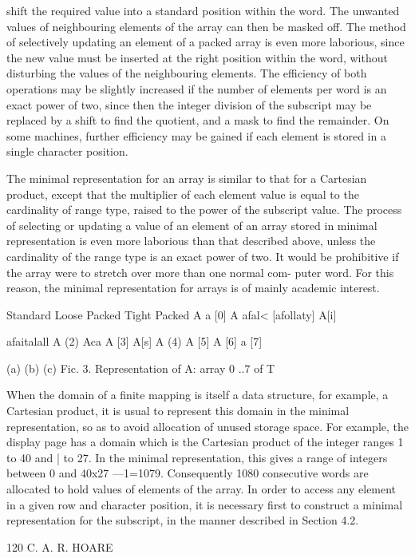 {{{			shift the required value into a standard position within the word. The unwanted values of neighbouring elements of the array can then be masked off. The method of selectively updating an element of a packed array is even more laborious, since the new value must be inserted at the right position within the word, without disturbing the values of the neighbouring elements. The efficiency of both operations may be slightly increased if the number of elements per word is an exact power of two, since then the integer division of the subscript may be replaced by a shift to find the quotient, and a mask to find the remainder. On some machines, further efficiency may be gained if each element is stored in a single character position.
			
			The minimal representation for an array is similar to that for a Cartesian product, except that the multiplier of each element value is equal to the cardinality of range type, raised to the power of the subscript value. The process of selecting or updating a value of an element of an array stored in minimal representation is even more laborious than that described above, unless the cardinality of the range type is an exact power of two. It would be prohibitive if the array were to stretch over more than one normal com- puter word. For this reason, the minimal representation for arrays is of mainly academic interest.
			
			
			Standard Loose Packed Tight Packed A a [0] A afal< [afollaty] A[i] {afaitalall A (2) Aca A [3] A[s] A (4) A [5] A [6] a [7]
				
				(a) (b) (c) Fic. 3. Representation of A: array 0 ..7 of T
				
				When the domain of a finite mapping is itself a data structure, for example, a Cartesian product, it is usual to represent this domain in the minimal representation, so as to avoid allocation of unused storage space. For example, the display page has a domain which is the Cartesian product of the integer ranges 1 to 40 and | to 27. In the minimal representation, this gives a range of integers between 0 and 40x27 —1=1079. Consequently 1080 consecutive words are allocated to hold values of elements of the array. In order to access any element in a given row and character position, it is necessary first to construct a minimal representation for the subscript, in the manner described in Section 4.2.
				
				120 C. A. R. HOARE
				
}}}}
